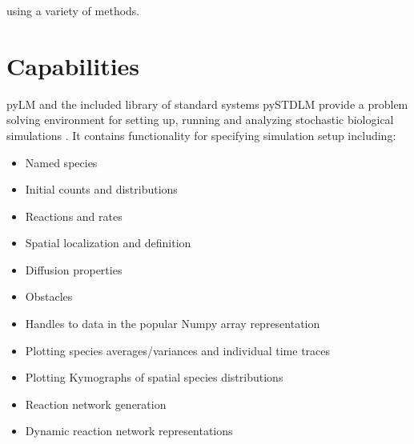 \noindent using a variety of methods.

\section{Capabilities}
pyLM and the included library of standard systems pySTDLM provide a problem solving environment for setting up, running and analyzing stochastic biological simulations \cite{Peterson2013}.  It contains functionality for specifying simulation setup including:

\begin{itemize}
\item Named species
\item Initial counts and distributions 
\item Reactions and rates
\item Spatial localization and definition
\item Diffusion properties
\item Obstacles
\item Handles to data in the popular Numpy array representation
\item Plotting species averages/variances and individual time traces
\item Plotting Kymographs of spatial species distributions
\item Reaction network generation
\item Dynamic reaction network representations
\end{itemize}

